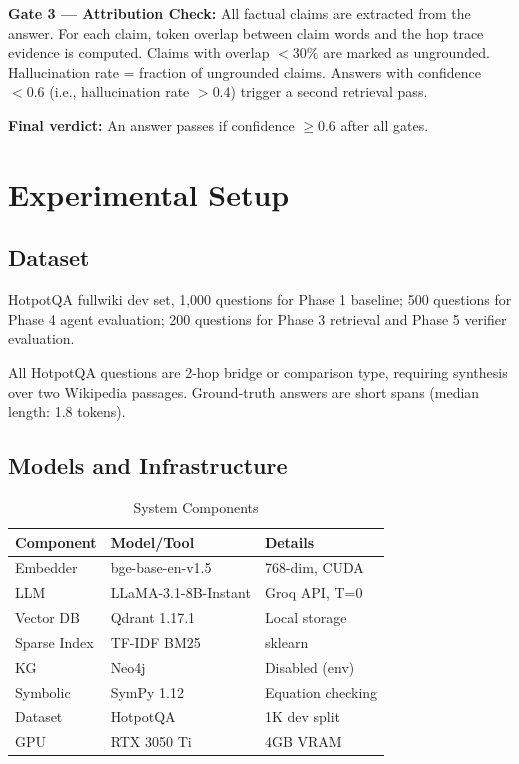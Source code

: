 \documentclass[conference]{IEEEtran}
\begin{document}
\textbf{Gate 3 — Attribution Check:}
All factual claims are extracted from the answer. For each claim, token overlap between claim words and the hop trace evidence is computed. Claims with overlap $< 30\%$ are marked as ungrounded. Hallucination rate = fraction of ungrounded claims. Answers with confidence $< 0.6$ (i.e., hallucination rate $> 0.4$) trigger a second retrieval pass.

\textbf{Final verdict:} An answer passes if confidence $\geq 0.6$ after all gates.

\section{Experimental Setup}

\subsection{Dataset}
HotpotQA \cite{yang2018hotpotqa} fullwiki dev set, 1,000 questions for Phase 1 baseline; 500 questions for Phase 4 agent evaluation; 200 questions for Phase 3 retrieval and Phase 5 verifier evaluation.

All HotpotQA questions are 2-hop bridge or comparison type, requiring synthesis over two Wikipedia passages. Ground-truth answers are short spans (median length: 1.8 tokens).

\subsection{Models and Infrastructure}

\begin{table}[h]
\centering
\caption{System Components}
\label{tab:components}
\begin{tabular}{lll}
\toprule
\textbf{Component} & \textbf{Model/Tool} & \textbf{Details} \\
\midrule
Embedder & bge-base-en-v1.5 & 768-dim, CUDA \\
LLM & LLaMA-3.1-8B-Instant & Groq API, T=0 \\
Vector DB & Qdrant 1.17.1 & Local storage \\
Sparse Index & TF-IDF BM25 & sklearn \\
KG & Neo4j & Disabled (env) \\
Symbolic & SymPy 1.12 & Equation checking \\
Dataset & HotpotQA & 1K dev split \\
GPU & RTX 3050 Ti & 4GB VRAM \\
\bottomrule
\end{tabular}
\end{table}
\end{document}
